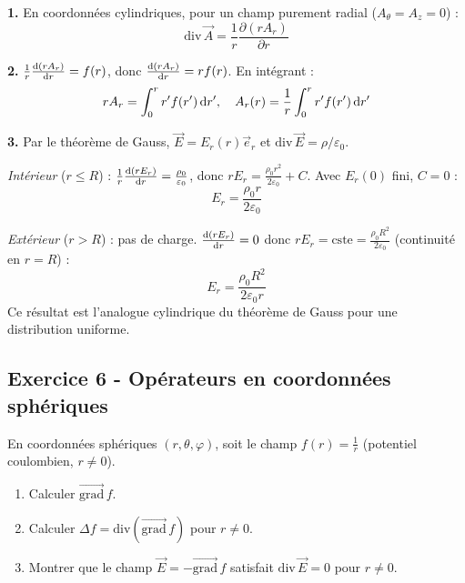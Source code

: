 \documentclass[12pt,a4paper]{article}
\begin{document}
\begin{boitecorrige}
\textbf{1.} En coordonnées cylindriques, pour un champ purement radial ($A_\theta=A_z=0$) :
\[
\text{div}\,\vec{A} = \frac{1}{r}\frac{\partial(r A_r)}{\partial r}
\]

\textbf{2.} $\frac{1}{r}\frac{\mathrm{d}(rA_r)}{\mathrm{d} r} = f(r)$, donc $\frac{\mathrm{d}(rA_r)}{\mathrm{d} r} = rf(r)$. En intégrant :
\[
rA_r = \int_0^r r'f(r')\,\mathrm{d} r', \quad A_r(r) = \frac{1}{r}\int_0^r r'f(r')\,\mathrm{d} r'
\]

\textbf{3.} Par le théorème de Gauss, $\vec{E}=E_r(r)\vec{e}_r$ et $\text{div}\,\vec{E}=\rho/\varepsilon_0$.

\textit{Intérieur} ($r\leq R$) : $\frac{1}{r}\frac{\mathrm{d}(rE_r)}{\mathrm{d} r}=\frac{\rho_0}{\varepsilon_0}$, donc $rE_r=\frac{\rho_0 r^2}{2\varepsilon_0}+C$. Avec $E_r(0)$ fini, $C=0$ :
\[
E_r = \frac{\rho_0 r}{2\varepsilon_0}
\]

\textit{Extérieur} ($r>R$) : pas de charge. $\frac{\mathrm{d}(rE_r)}{\mathrm{d} r}=0$ donc $rE_r=\text{cste}=\frac{\rho_0 R^2}{2\varepsilon_0}$ (continuité en $r=R$) :
\[
E_r = \frac{\rho_0 R^2}{2\varepsilon_0 r}
\]
Ce résultat est l'analogue cylindrique du théorème de Gauss pour une distribution uniforme.
\end{boitecorrige}

\subsection*{Exercice 6 - Opérateurs en coordonnées sphériques \niveau{\difficile}}

\begin{boiteexercice}
En coordonnées sphériques $(r,\theta,\varphi)$, soit le champ $f(r) = \frac{1}{r}$ (potentiel coulombien, $r\neq0$).
\begin{enumerate}
  \item Calculer $\overrightarrow{\text{grad}}\,f$.
  \item Calculer $\Delta f = \text{div}(\overrightarrow{\text{grad}}\,f)$ pour $r\neq0$.
  \item Montrer que le champ $\vec{E} = -\overrightarrow{\text{grad}}\,f$ satisfait $\text{div}\,\vec{E} = 0$ pour $r\neq0$.
\end{enumerate}
\end{boiteexercice}
\end{document}
